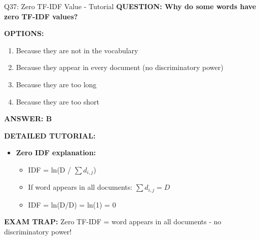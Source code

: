 \documentclass[8pt]{beamer}
\begin{document}
	\begin{frame}{Q37: Zero TF-IDF Value - Tutorial}
		\fontsize{6.5}{7.5}\selectfont
		\textbf{QUESTION: Why do some words have zero TF-IDF values?}
		
		\vspace{0.1cm}
		\textbf{OPTIONS:}
		\begin{enumerate}
			\item Because they are not in the vocabulary
			\item Because they appear in every document (no discriminatory power)
			\item Because they are too long
			\item Because they are too short
		\end{enumerate}
		
		\vspace{0.1cm}
		\textcolor{myblue}{\textbf{ANSWER: B}}
		
		\vspace{0.1cm}
		\textbf{DETAILED TUTORIAL:}
		\begin{itemize}
			\item \textbf{Zero IDF explanation:}
			\begin{itemize}
				\item IDF = ln(D / $\sum d_{i,j}$)
				\item If word appears in all documents: $\sum d_{i,j} = D$
				\item IDF = ln(D/D) = ln(1) = 0
			\end{itemize}
		\end{itemize}
		
		\textcolor{myred}{\textbf{EXAM TRAP:}} Zero TF-IDF = \textcolor{myblue}{word appears in all documents} - no discriminatory power!
	\end{frame}
	
\end{document}
